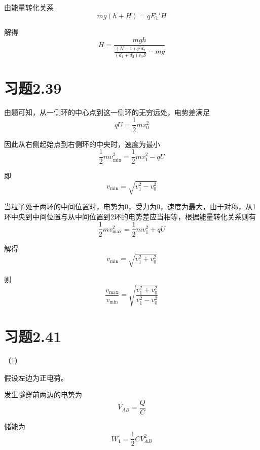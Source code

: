\documentclass{SCIS2020cn}
\begin{document}
由能量转化关系
\begin{equation}
    mg(h+H)=qE_1'H
\end{equation}

解得
\begin{equation}
    H=\frac{mgh}{\frac{(N-1)q^2d_2}{(d_1+d_2)\varepsilon_0S}-mg}
\end{equation}

\section{习题2.39}
由题可知，从一侧环的中心点到这一侧环的无穷远处，电势差满足
\begin{equation}
    qU=\frac{1}{2}mv_0^2
\end{equation}

因此从右侧起始点到右侧环的中央时，速度为最小
\begin{equation}
    \frac{1}{2}mv_{\min}^2=\frac{1}{2}mv_1^2-qU
\end{equation}

即
\begin{equation}
    v_{\min}=\sqrt{v_1^2-v_0^2}
\end{equation}

当粒子处于两环的中间位置时，电势为0，受力为0，速度为最大，由于对称，从1环中央到中间位置与从中间位置到2环的电势差应当相等，根据能量转化关系则有
\begin{equation}
    \frac{1}{2}mv_{\max}^2=\frac{1}{2}mv_1^2+qU
\end{equation}

解得
\begin{equation}
    v_{\min}=\sqrt{v_1^2+v_0^2}
\end{equation}

则
\begin{equation}
    \frac{v_{\max}}{v_{\min}}=\sqrt{\frac{v_1^2+v_0^2}{v_1^2-v_0^2}}
\end{equation}

\section{习题2.41}
（1）

假设左边为正电荷。

发生隧穿前两边的电势为
\begin{equation}
    V_{AB}=\frac{Q}{C}
\end{equation}

储能为
\begin{equation}
    W_1=\frac{1}{2}CV_{AB}^2
\end{equation}
\end{document}
